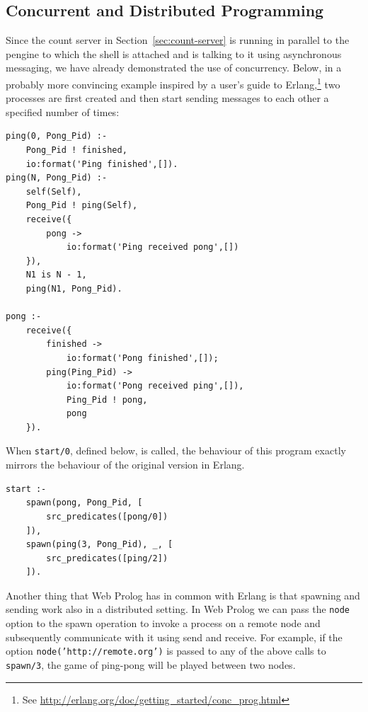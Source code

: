 \documentclass{tlp}
\begin{document}
\subsection{Concurrent and Distributed Programming}

Since the count server in Section~\ref{sec:count-server} is running in parallel to the pengine to which the shell is attached and is talking to it using asynchronous messaging, we have already demonstrated the use of concurrency. Below, in a probably more convincing example inspired by a user's guide to Erlang,\footnote{See \url{http://erlang.org/doc/getting_started/conc_prog.html}} two processes are first created and then start sending messages to each other a specified number of times:

\begin{lstlisting}
ping(0, Pong_Pid) :-
    Pong_Pid ! finished,
    io:format('Ping finished',[]).
ping(N, Pong_Pid) :-
    self(Self),
    Pong_Pid ! ping(Self),
    receive({
        pong ->
            io:format('Ping received pong',[])
    }),
    N1 is N - 1,
    ping(N1, Pong_Pid).
    
pong :-
    receive({
        finished ->
            io:format('Pong finished',[]);
        ping(Ping_Pid) ->
            io:format('Pong received ping',[]),
            Ping_Pid ! pong,
            pong
    }).
\end{lstlisting}

\noindent When \texttt{start/0}, defined below, is called, the behaviour of this program exactly mirrors the behaviour of the original version in Erlang.


\begin{lstlisting}
start :-
    spawn(pong, Pong_Pid, [
        src_predicates([pong/0])
    ]),
    spawn(ping(3, Pong_Pid), _, [
        src_predicates([ping/2])
    ]).
\end{lstlisting}

\noindent Another thing that Web Prolog has in common with Erlang is that spawning and sending work also in a distributed setting. In Web Prolog we can pass the \texttt{node} option to the spawn operation to invoke a process on a remote node and subsequently communicate with it using send and receive. For example, if the option \texttt{node('http://remote.org')} is passed to any of the above calls to \texttt{spawn/3}, the game of ping-pong will be played between two nodes.

%
\end{document}
